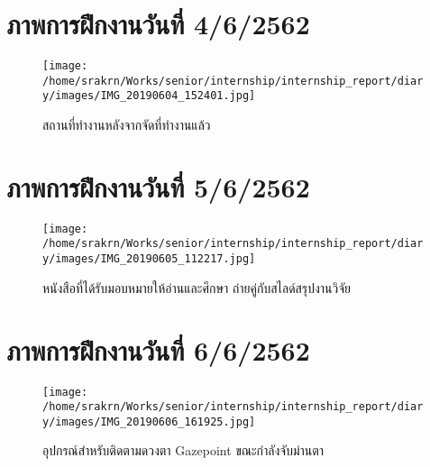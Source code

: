 
\section*{ภาพการฝึกงานวันที่ 4/6/2562}
\begin{figure}[ht]
    \centering
    \texttt{[image: /home/srakrn/Works/senior/internship/internship\_report/diary/images/IMG\_20190604\_152401.jpg]}
    \caption{สถานที่ทำงานหลังจากจัดที่ทำงานแล้ว}
\end{figure}

\section*{ภาพการฝึกงานวันที่ 5/6/2562}
\begin{figure}[ht]
    \centering
    \texttt{[image: /home/srakrn/Works/senior/internship/internship\_report/diary/images/IMG\_20190605\_112217.jpg]}
    \caption{หนังสือที่ได้รับมอบหมายให้อ่านและศึกษา ถ่ายคู่กับสไลด์สรุปงานวิจัย}
\end{figure}

\section*{ภาพการฝึกงานวันที่ 6/6/2562}
\begin{figure}[ht]
    \centering
    \texttt{[image: /home/srakrn/Works/senior/internship/internship\_report/diary/images/IMG\_20190606\_161925.jpg]}
    \caption{อุปกรณ์สำหรับติดตามดวงตา Gazepoint ขณะกำลังจับม่านตา}
\end{figure}

